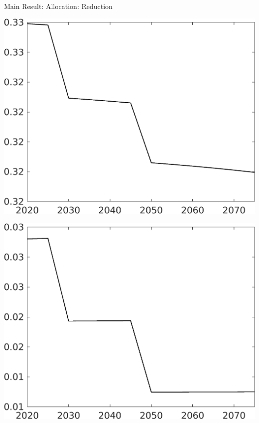 \documentclass[11pt,aspectratio=169]{beamer}
\begin{document}
\begin{frame}{Main Result: Allocation: Reduction}
\begin{minipage}[]{0.32\textwidth}
	\end{minipage}
\begin{minipage}[]{0.32\textwidth}
	\includegraphics[width=1\textwidth]{../codding_model/own_basedOnFried/optimalPol_elastS_DisuSci/figures/all_1705/Single_OPT_T_NoTaus_hl_spillover0_sep1_BN0_ineq0_red0_etaa0.79.png}
\end{minipage}
\begin{minipage}[]{0.32\textwidth}
	\includegraphics[width=1\textwidth]{../codding_model/own_basedOnFried/optimalPol_elastS_DisuSci/figures/all_1705/Single_OPT_T_NoTaus_sff_spillover0_sep1_BN0_ineq0_red0_etaa0.79.png}

\end{minipage}
\end{frame}
\end{document}
